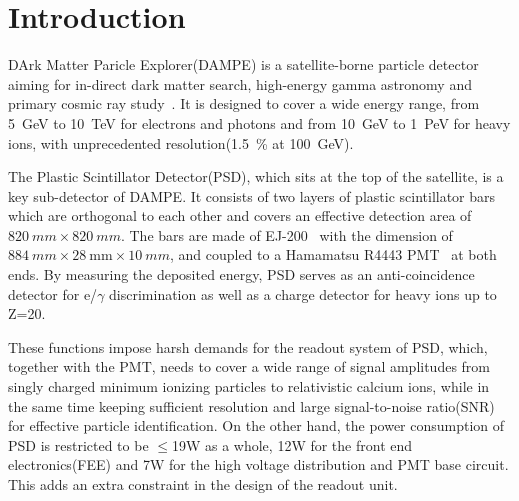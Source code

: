 \documentclass[5p, times]{elsarticle}
\begin{document}
\linenumbers
\section{Introduction}
\label{sec:introduction}

DArk Matter Paricle Explorer(DAMPE) is a satellite-borne particle detector aiming for in-direct dark matter search, high-energy gamma astronomy and primary cosmic ray study~\cite{Chang_Jin_dampe}.
It is designed to cover a wide energy range, from \SI{5}{GeV} to \SI{10}{TeV} for electrons and photons and from \SI{10}{GeV} to \SI{1}{PeV} for heavy ions, with unprecedented resolution(\SI{1.5}{\percent} at \SI{100}{\giga\electronvolt}).

The Plastic Scintillator Detector(PSD), which sits at the top of the satellite, is a key sub-detector of DAMPE.
It consists of two layers of plastic scintillator bars which are orthogonal to each other and covers an effective detection area of $\SI{820}{mm}\times\SI{820}{mm}$.
The bars are made of EJ-200~\cite{scintillator} with the dimension of $\SI{884}{mm} \times \SI{28}{\milli\meter} \times \SI{10}{mm}$, and coupled to a Hamamatsu R4443 PMT~\cite{r4443} at both ends.
By measuring the deposited energy, PSD serves as an anti-coincidence detector for e/$\gamma$ discrimination as well as a charge detector for heavy ions up to Z=20.

These functions impose harsh demands for the readout system of PSD, which, together with the PMT, needs to cover a wide range of signal amplitudes from singly charged minimum ionizing particles to relativistic calcium ions, while in the same time keeping sufficient resolution and large signal-to-noise ratio(SNR) for effective particle identification. 
On the other hand, the power consumption of PSD is restricted to be $\leq$19W as a whole, 12W for the front end electronics(FEE) and 7W for the high voltage distribution and PMT base circuit.
This adds an extra constraint in the design of the readout unit.

\end{document}
